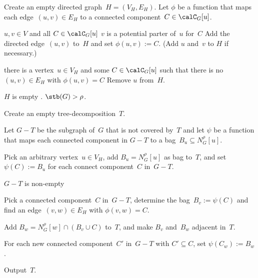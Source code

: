 \begin{algorithm}
    [!htb]
    \caption
    {%
        Constructs, for a given graph~$G = (V, E)$ with strong tree-breadth~$\rho$, a tree-decomposition~$T$ with breadth~$\rho$.
    }
    \label{algo:weakTB}

Create an empty directed graph~$H = (V_H, E_H)$.
Let $\phi$ be a function that maps each edge~$(u, v) \in E_H$ to a connected component~$C \in \calC_G[u]$.
\label{line:weakTB_initH}

\ForEach
{%
    \( u, v \in V \) and all \( C \in \calC_G[u] \)
}
{%
    \If
    {%
        \( v \) is a potential parter of~\( u \) for~\( C \)%
        \label{line:weakTB_CheckUV}
    }
    {%
        Add the directed edge~$(u, v)$ to~$H$ and set $\phi(u, v) := C$.
        (Add $u$ and~$v$ to $H$ if necessary.)
        \label{line:weakTB_AddUV}
    }
}

\While
{%
    there is a vertex~\( u \in V_H \) and some \( C \in \calC_G[u] \) such that there is no \( (u, v) \in E_H \) with \( \phi(u, v) = C \)
    \label{line:weakTB_RemoveUloop}
}
{
    Remove $u$ from~$H$.
    \label{line:weakTB_RemoveU}
}

\If
{%
    \( H \) is empty
}
{%
    .
    $\stb(G) > \rho$.
}

Create an empty tree-decomposition~$T$.
\label{line:weakTB_initT}

Let $G - T$ be the subgraph of~$G$ that is not covered by~$T$ and let $\psi$ be a function that maps each connected component in $G - T$ to a bag~$B_u \subseteq N_G^\rho[u]$.

Pick an arbitrary vertex~$u \in V_H$, add $B_u = N_G^\rho[u]$ as bag to~$T$, and set $\psi(C) := B_u$ for each connect component~$C$ in~$G - T$.
\label{line:weakTB_addFirstBag}

\While
{%
    \( G - T \) is non-empty
    \label{line:weakTB_Tloop}
}
{%
    Pick a connected component~$C$ in~$G - T$, determine the bag~$B_v := \psi(C)$ and find an edge~$(v, w) \in E_H$ with $\phi(v, w) = C$.
    \label{line:weakTB_PickNextBag}

    Add $B_w = N_G^\rho[w] \cap (B_v \cup C)$ to~$T$, and make $B_v$ and~$B_w$ adjacent in~$T$.
    \label{line:weakTB_AddBag}

    For each new connected component~$C'$ in~$G - T$ with $C' \subseteq C$, set $\psi(C_w) := B_w$.%
    \label{line:weakTB_UpdateF}
}

Output~$T$.
\end{algorithm}

